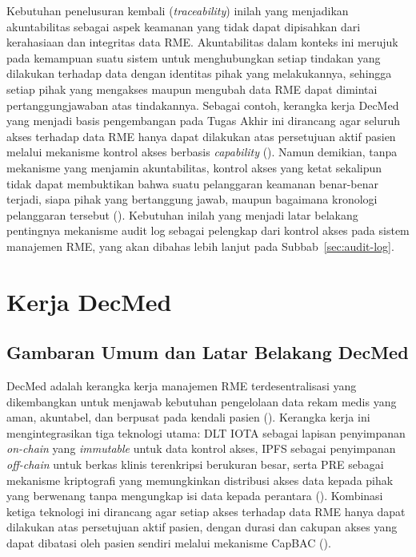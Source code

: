 Kebutuhan penelusuran kembali (\textit{traceability}) inilah yang
menjadikan akuntabilitas sebagai aspek keamanan yang tidak dapat
dipisahkan dari kerahasiaan dan integritas data RME. Akuntabilitas
dalam konteks ini merujuk pada kemampuan suatu sistem untuk
menghubungkan setiap tindakan yang dilakukan terhadap data dengan
identitas pihak yang melakukannya, sehingga setiap pihak yang mengakses
maupun mengubah data RME dapat dimintai pertanggungjawaban atas
tindakannya. Sebagai contoh, kerangka kerja DecMed yang menjadi basis
pengembangan pada Tugas Akhir ini dirancang agar seluruh akses terhadap
data RME hanya dapat dilakukan atas persetujuan aktif pasien melalui
mekanisme kontrol akses berbasis \textit{capability} (\cite{DecMed}).
Namun demikian, tanpa mekanisme yang menjamin akuntabilitas, kontrol
akses yang ketat sekalipun tidak dapat membuktikan bahwa suatu
pelanggaran keamanan benar-benar terjadi, siapa pihak yang bertanggung
jawab, maupun bagaimana kronologi pelanggaran tersebut (\cite{DecMed}).
Kebutuhan inilah yang menjadi latar belakang pentingnya mekanisme
audit log sebagai pelengkap dari kontrol akses pada sistem manajemen
RME, yang akan dibahas lebih lanjut pada Subbab~\ref{sec:audit-log}.





\section{Kerja DecMed}
\label{sec:decmed}

\subsection{Gambaran Umum dan Latar Belakang DecMed}
\label{subsec:decmed-gambaran-umum}

DecMed adalah kerangka kerja manajemen RME terdesentralisasi yang
dikembangkan untuk menjawab kebutuhan pengelolaan data rekam medis
yang aman, akuntabel, dan berpusat pada kendali pasien
(\cite{DecMed}). Kerangka kerja ini mengintegrasikan tiga teknologi
utama: DLT IOTA sebagai lapisan penyimpanan \textit{on-chain} yang
\textit{immutable} untuk data kontrol akses, IPFS sebagai penyimpanan
\textit{off-chain} untuk berkas klinis terenkripsi berukuran besar,
serta PRE sebagai mekanisme kriptografi yang memungkinkan distribusi
akses data kepada pihak yang berwenang tanpa mengungkap isi data
kepada perantara (\cite{DecMed}). Kombinasi ketiga teknologi ini
dirancang agar setiap akses terhadap data RME hanya dapat dilakukan
atas persetujuan aktif pasien, dengan durasi dan cakupan akses yang
dapat dibatasi oleh pasien sendiri melalui mekanisme CapBAC
(\cite{DecMed}).

